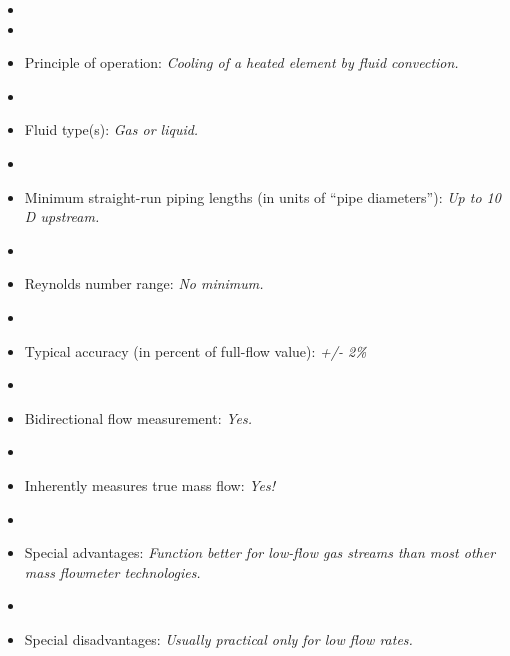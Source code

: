 \documentclass[12pt,a4paper]{article}
\begin{document}
\begin{itemize}
\goodbreak
\item{} 
\vskip 5pt
\item\item{} Principle of operation: {\it Cooling of a heated element by fluid convection.}
\vskip 5pt
\item\item{} Fluid type(s): {\it Gas or liquid.}
\vskip 5pt
\item\item{} Minimum straight-run piping lengths (in units of ``pipe diameters''): {\it Up to 10 D upstream.}
\vskip 5pt
\item\item{} Reynolds number range: {\it No minimum.}
\vskip 5pt
\item\item{} Typical accuracy (in percent of full-flow value): {\it +/- 2\%}
\vskip 5pt
\item\item{} Bidirectional flow measurement: {\it Yes.}
\vskip 5pt
\item\item{} Inherently measures true mass flow: {\it Yes!}
\vskip 5pt
\item\item{} Special advantages: {\it Function better for low-flow gas streams than most other mass flowmeter technologies.}
\vskip 5pt
\item\item{} Special disadvantages: {\it Usually practical only for low flow rates.}
\end{itemize}
\end{document}
